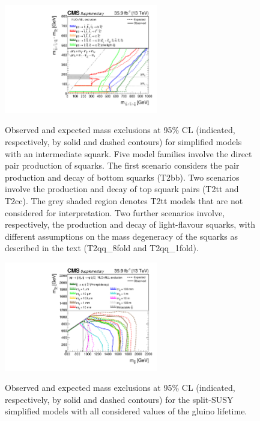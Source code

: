 \clearpage
\begin{figure}[!t]
  \centering
  \includegraphics[width=0.6\textwidth]{Supplementary/CMS-SUS-16-038_Figure-aux_024}\\
  \caption{Observed and expected mass exclusions at 95\% CL
    (indicated, respectively, by solid and dashed contours) for
    simplified models with an intermediate squark.
    Five model families involve the direct pair
    production of squarks. The first scenario considers the pair
    production and decay of bottom squarks (T2bb). Two
    scenarios involve the production and decay of top squark pairs
    (T2tt and T2cc). The grey shaded region denotes
    T2tt models that are not considered for
    interpretation. Two further scenarios involve, respectively, the 
    production and decay of light-flavour squarks, with different
    assumptions on the mass degeneracy of the squarks as described in
    the text (T2qq\_8fold and T2qq\_1fold).}
  \label{fig:limits-sms_aux_squarks} 
\end{figure}

\begin{figure}[!t]
  \centering
  \includegraphics[width=0.6\textwidth]{Supplementary/CMS-SUS-16-038_Figure-aux_025}\\
  \caption{Observed and expected mass exclusions at 95\% CL
    (indicated, respectively, by solid and dashed contours) for
    the split-SUSY simplified models with all considered values of the gluino lifetime.}
  \label{fig:limits-sms_aux_long_lived} 
\end{figure}
